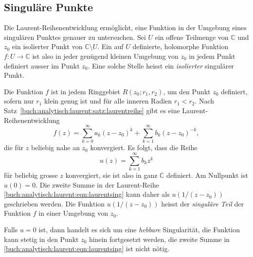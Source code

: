%
%
%
\subsection{Singuläre Punkte}
Die Laurent-Reihenentwicklung ermöglicht, eine Funktion in der Umgebung
eines singulären Punktes genauer zu untersuchen.
Sei $U$ ein offene Teilmenge von $\mathbb{C}$ und $z_0$ ein isolierter
Punkt von $\mathbb{C}\setminus U$.
Ein auf $U$ definierte, holomorphe Funktion $f\colon U\to\mathbb{C}$
ist also in jeder genügend kleinen Umgebung von $z_0$ in jedem Punkt
definiert ausser im Punkt $z_0$.
Eine solche Stelle heisst ein \emph{isolierter} singulärer Punkt.
%
%

Die Funktion $f$ ist in jedem Ringgebiet $R(z_0;r_1,r_2)$, um den Punkt
$z_0$ definiert, sofern nur $r_1$ klein genug ist und für 
alle inneren Radien $r_1<r_2$.
Nach Satz~\ref{buch:analytisch:laurent:satz:laurentreihe} gibt es
eine Laurent-Reihenentwicklung
%
\begin{equation}
f(z)
=
\sum_{k=0}^\infty a_k(z-z_0)^k
+
\sum_{k=1}^\infty b_k(z-z_0)^{-k},
\label{buch:analytisch:laurent:eqn:laurentsing}
\end{equation}
die für $z$ beliebig nahe an $z_0$ konvergiert.
Es folgt, dass die Reihe
\[
u(z)
=
\sum_{k=1}^\infty b_kz^k
\]
für beliebig grosse $z$ konvergiert, sie ist also in ganz $\mathbb{C}$
definiert.
Am Nullpunkt ist $u(0)=0$.
Die zweite Summe in der Laurent-Reihe
\eqref{buch:analytisch:laurent:eqn:laurentsing}
kann daher als $u(1/(z-z_0))$ geschrieben werden.
Die Funktion $u(1/(z-z_0))$ heisst der \emph{singuläre Teil} der Funktion
$f$ in einer Umgebung von $z_0$.
%

Falls $u=0$ ist, dann handelt es sich um eine \emph{hebbare} Singularität,
%
%
%
die Funktion kann stetig in den Punkt $z_0$ hinein fortgesetzt werden,
die zweite Summe in \eqref{buch:analytisch:laurent:eqn:laurentsing}
ist nicht nötig.

